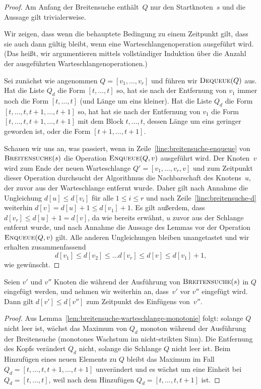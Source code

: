 \begin{proof}
Am Anfang der Breitensuche enthält~$Q$ nur den Startknoten~$s$ und die Aussage gilt trivialerweise.

Wir zeigen, dass wenn die behauptete Bedingung zu einem Zeitpunkt gilt, dass sie auch dann gültig bleibt, wenn eine Warteschlangenoperation ausgeführt wird.
(Das heißt, wir argumentieren mittels vollständiger Induktion über die Anzahl der ausgeführten Warteschlangenoperationen.)

\condclearpage 

Sei zunächst wie angenommen $Q=[v_1,\ldots,v_r]$ und führen wir $\mathop{\text{\textsc{Dequeue}}}(Q)$ aus.
Hat die Liste $Q_d$ die Form $[t,\ldots,t]$ so, hat sie nach der Entfernung von $v_1$ immer noch die Form $[t,\ldots,t]$ (und Länge um eins kleiner).  Hat die Liste $Q_d$ die Form $[t,\ldots,t,t+1,\ldots,t+1]$ so, hat hat sie nach der Entfernung von $v_1$ die Form $[t,\ldots,t,t+1,\ldots,t+1]$ mit dem Block $t,\ldots,t$, dessen Länge um eins geringer geworden ist, oder die Form $[t+1,\ldots,t+1]$. 

\condclearpage 

Schauen wir uns an, was passiert, wenn in Zeile~\ref{line:breitensuche-enqueue} von $\mathop{\text{\textsc{Breitensuche}}}(s)$ die Operation $\mathop{\text{\textsc{Enqueue}}}(Q,v)$ ausgeführt wird.
Der Knoten~$v$ wird zum Ende der neuen Warteschlange $Q'=[v_1,\ldots,v_r,v]$ und zum Zeitpunkt dieser Operation durchsucht der Algorithmus die Nachbarschaft des Knotens~$u$, der zuvor aus der Warteschlange entfernt wurde.
Daher gilt nach Annahme die Ungleichung $d[u] \leq d[v_i]$ für alle $1 \leq i \leq r$ und nach Zeile~\ref{line:breitensuche-d} weiterhin $d[v] = d[u]+1 \leq d[v_1]+1$.
Es gilt außerdem, dass $d[v_r] \leq d[u]+1=d[v]$, da wie bereits erwähnt, $u$ zuvor aus der Schlange entfernt wurde, und nach Annahme die Aussage des Lemmas vor der Operation $\mathop{\text{\textsc{Enqueue}}}(Q,v)$ gilt.
Alle anderen Ungleichungen bleiben unangetastet und wir erhalten zusammenfassend
\[
d[v_1] \leq d[v_2] \leq \ldots d[v_r] \leq d[v] \leq d[v_1] + 1,
\]
wie gewünscht.
\end{proof}

\begin{kor}
\label{cor:breitensuche-warteschlange}
Seien $v'$ und $v''$ Knoten die während der Ausführung von $\mathop{\text{\textsc{Breitensuche}}}(s)$ in $Q$ eingefügt werden, und nehmen wir weiterhin an, dass~$v'$ vor $v''$ eingefügt wird.
Dann gilt $d[v'] \leq d[v'']$ zum Zeitpunkt des Einfügens von~$v''$.
\end{kor}

\begin{proof}
Aus Lemma~\ref{lem:breitensuche-warteschlange-monotonie} folgt: solange $Q$ nicht leer ist, wächst das Maximum von $Q_d$ monoton während der Ausführung der Breitensuche (monotones Wachstum im nicht-strikten Sinn). Die Entfernung des Kopfs verändert $Q_d$ nicht, solange die Schlange $Q$ nicht leer ist. Beim Hinzufügen eines neuen Elements zu $Q$ bleibt das Maximum im Fall $Q_d=[t,\ldots,t,t+1,\ldots,t+1]$ unverändert und es wächst um eine Einheit bei $Q_d=[t,\ldots,t]$, weil nach dem Hinzufügen $Q_d = [t,\ldots,t,t+1]$ ist. 
\end{proof}



